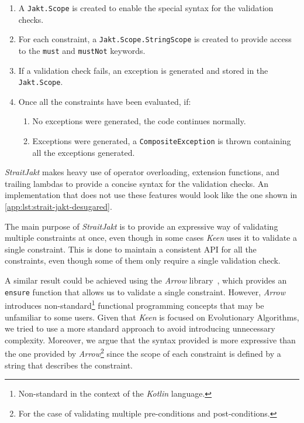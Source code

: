         \begin{enumerate}
            \item A \texttt{Jakt.Scope} is created to enable the special syntax for the validation checks.
            \item For each constraint, a \texttt{Jakt.Scope.StringScope} is created to provide access to the
            \texttt{must} and \texttt{mustNot} keywords.
            \item If a validation check fails, an exception is generated and stored in the \texttt{Jakt.Scope}.
            \item Once all the constraints have been evaluated, if:
                \begin{enumerate}
                    \item No exceptions were generated, the code continues normally.
                    \item Exceptions were generated, a \texttt{CompositeException} is thrown containing all the
                        exceptions generated.
                \end{enumerate}
        \end{enumerate}

        \textit{StraitJakt} makes heavy use of operator overloading, extension functions, and trailing lambdas to
        provide a concise syntax for the validation checks. An implementation that does not use these features would
        look like the one shown in \vref{app:lst:strait-jakt-desugared}.
        
        The main purpose of \textit{StraitJakt} is to provide an expressive way of validating multiple constraints at
        once, even though in some cases \textit{Keen} uses it to validate a single constraint. This is done to maintain
        a consistent API for all the constraints, even though some of them only require a single validation check.

        A similar result could be achieved using the \textit{Arrow} library~\autocite{Arrow}, which provides an 
        \texttt{ensure} function that allows us to validate a single constraint. However, \textit{Arrow} introduces 
        non-standard\footnote{
            Non-standard in the context of the \textit{Kotlin} language.
        } functional programming concepts that may be unfamiliar to some users. Given that \textit{Keen} is focused on
        Evolutionary Algorithms, we tried to use a more standard approach to avoid introducing unnecessary complexity. 
        Moreover, we argue that the syntax provided is more expressive than the one provided by \textit{Arrow}\footnote{
            For the case of validating multiple pre-conditions and post-conditions.
        } since the
        scope of each constraint is defined by a string that describes the constraint.

